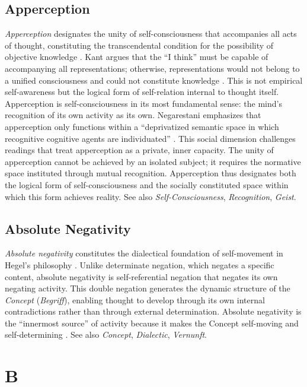 \documentclass{book}
\begin{document}
\section{Apperception}

\textit{Apperception} designates the unity of self-consciousness that accompanies all acts of thought, constituting the transcendental condition for the possibility of objective knowledge \parencite{Kant1781}. Kant argues that the ``I think'' must be capable of accompanying all representations; otherwise, representations would not belong to a unified consciousness and could not constitute knowledge \parencite{Kant1781}. This is not empirical self-awareness but the logical form of self-relation internal to thought itself. Apperception is self-consciousness in its most fundamental sense: the mind's recognition of its own activity as its own. Negarestani emphasizes that apperception only functions within a ``deprivatized semantic space in which recognitive cognitive agents are individuated'' \parencite[271]{Negarestani2018}. This social dimension challenges readings that treat apperception as a private, inner capacity. The unity of apperception cannot be achieved by an isolated subject; it requires the normative space instituted through mutual recognition. Apperception thus designates both the logical form of self-consciousness and the socially constituted space within which this form achieves reality. See also \textit{Self-Consciousness}, \textit{Recognition}, \textit{Geist}.

\section{Absolute Negativity}

\textit{Absolute negativity} constitutes the dialectical foundation of self-movement in Hegel's philosophy \parencite{Hegel:2014aa}. Unlike determinate negation, which negates a specific content, absolute negativity is self-referential negation that negates its own negating activity. This double negation generates the dynamic structure of the \textit{Concept} (\textit{Begriff}), enabling thought to develop through its own internal contradictions rather than through external determination. Absolute negativity is the ``innermost source'' of activity because it makes the Concept self-moving and self-determining \parencite{Hegel:2014aa}. See also \textit{Concept}, \textit{Dialectic}, \textit{Vernunft}.

\chapter{B}
\end{document}
